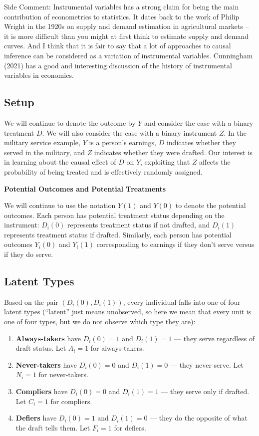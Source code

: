 \documentclass[
  letterpaper,
  DIV=11,
  numbers=noendperiod]{scrreprt}
\begin{document}
{Side Comment: } Instrumental variables has a strong claim for being the
main contribution of econometrics to statistics. It dates back to the
work of Philip Wright in the 1920s on supply and demand estimation in
agricultural markets -- it is more difficult than you might at first
think to estimate supply and demand curves. And I think that it is fair
to say that a lot of approaches to causal inference can be considered as
a variation of instrumental variables. Cunningham (2021) has a good and
interesting discussion of the history of instrumental variables in
economics.

\subsection{Setup}\label{setup}

We will continue to denote the outcome by \(Y\) and consider the case
with a binary treatment \(D\). We will also consider the case with a
binary instrument \(Z\). In the military service example, \(Y\) is a
person's earnings, \(D\) indicates whether they served in the military,
and \(Z\) indicates whether they were drafted. Our interest is in
learning about the causal effect of \(D\) on \(Y\), exploiting that
\(Z\) affects the probability of being treated and is effectively
randomly assigned.

\textbf{Potential Outcomes and Potential Treatments}

We will continue to use the notation \(Y(1)\) and \(Y(0)\) to denote the
potential outcomes. Each person has potential treatment status depending
on the instrument: \(D_i(0)\) represents treatment status if not
drafted, and \(D_i(1)\) represents treatment status if drafted.
Similarly, each person has potential outcomes \(Y_i(0)\) and \(Y_i(1)\)
corresponding to earnings if they don't serve versus if they do serve.

\subsection{Latent Types}\label{latent-types}

Based on the pair \((D_i(0), D_i(1))\), every individual falls into one
of four latent types (``latent'' just means unobserved, so here we mean
that every unit is one of four types, but we do not observe which type
they are):

\begin{enumerate}
\def\labelenumi{\arabic{enumi}.}
\item
  \textbf{Always-takers} have \(D_i(0) = 1\) and \(D_i(1) = 1\) --- they
  serve regardless of draft status. Let \(A_i=1\) for always-takers.
\item
  \textbf{Never-takers} have \(D_i(0) = 0\) and \(D_i(1) = 0\) --- they
  never serve. Let \(N_i=1\) for never-takers.
\item
  \textbf{Compliers} have \(D_i(0) = 0\) and \(D_i(1) = 1\) --- they
  serve only if drafted. Let \(C_i=1\) for compliers.
\item
  \textbf{Defiers} have \(D_i(0) = 1\) and \(D_i(1) = 0\) --- they do
  the opposite of what the draft tells them. Let \(F_i=1\) for defiers.
\end{enumerate}
\end{document}
